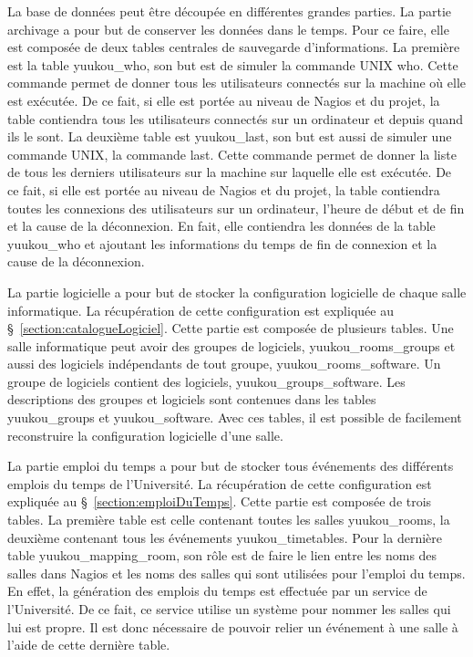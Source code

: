 La base de donn\'ees peut \^etre d\'ecoup\'ee en diff\'erentes grandes parties.
La partie archivage a pour but de conserver les donn\'ees dans le temps.
Pour ce faire, elle est compos\'ee de deux tables centrales de sauvegarde d'informations.
La premi\`ere est la table \textsf{yuukou\_who}, son but est de simuler la commande UNIX \textsf{who}.
Cette commande permet de donner tous les utilisateurs connect\'es sur la machine o\`u elle est ex\'ecut\'ee.
De ce fait, si elle est port\'ee au niveau de Nagios et du projet, la table contiendra tous les utilisateurs connect\'es sur un ordinateur et depuis quand ils le sont.
La deuxi\`eme table est \textsf{yuukou\_last}, son but est aussi de simuler une commande UNIX, la commande \textsf{last}.
Cette commande permet de donner la liste de tous les derniers utilisateurs sur la machine sur laquelle elle est ex\'ecut\'ee.
De ce fait, si elle est port\'ee au niveau de Nagios et du projet, la table contiendra toutes les connexions des utilisateurs sur un ordinateur, l'heure de d\'ebut et de fin et la cause de la d\'econnexion. En fait, elle contiendra les donn\'ees de la table \textsf{yuukou\_who} et ajoutant les informations du temps de fin de connexion et la cause de la d\'econnexion.

La partie logicielle a pour but de stocker la configuration logicielle de chaque salle informatique.
La r\'ecup\'eration de cette configuration est expliqu\'ee au \S~\ref{section:catalogueLogiciel}.
Cette partie est compos\'ee de plusieurs tables.
Une salle informatique peut avoir des groupes de logiciels, \textsf{yuukou\_rooms\_groups} et aussi des logiciels ind\'ependants de tout groupe, \textsf{yuukou\_rooms\_software}.
Un groupe de logiciels contient des logiciels, \textsf{yuukou\_groups\_software}.
Les descriptions des groupes et logiciels sont contenues dans les tables \textsf{yuukou\_groups} et \textsf{yuukou\_software}.
Avec ces tables, il est possible de facilement reconstruire la configuration logicielle d'une salle.

La partie emploi du temps a pour but de stocker tous \'ev\'enements des diff\'erents emplois du temps de l'Universit\'e.
La r\'ecup\'eration de cette configuration est expliqu\'ee au \S~\ref{section:emploiDuTemps}.
Cette partie est compos\'ee de trois tables.
La premi\`ere table est celle contenant toutes les salles \textsf{yuukou\_rooms}, la deuxi\`eme contenant tous les \'ev\'enements \textsf{yuukou\_timetables}.
Pour la derni\`ere table \textsf{yuukou\_mapping\_room}, son r\^ole est de faire le lien entre les noms des salles dans Nagios et les noms des salles qui sont utilis\'ees pour l'emploi du temps.
En effet, la g\'en\'eration des emplois du temps est effectu\'ee par un service de l'Universit\'e.
De ce fait, ce service utilise un syst\`eme pour nommer les salles qui lui est propre.
Il est donc n\'ecessaire de pouvoir relier un \'ev\'enement \`a une salle \`a l'aide de cette derni\`ere table.

